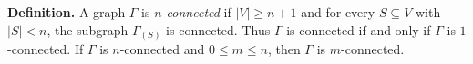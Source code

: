 \textbf{Definition.} A graph $\Gamma$ is \textit{$n$-connected} if $|V| \geq n+1$ and for every $S \subseteq V$ with $|S| < n$, the subgraph $\Gamma_{(S)}$ is connected. Thus $\Gamma$ is connected if and only if $\Gamma$ is $1$-connected. If $\Gamma$ is $n$-connected and $0 \leq m \leq n$, then $\Gamma$ is $m$-connected.
